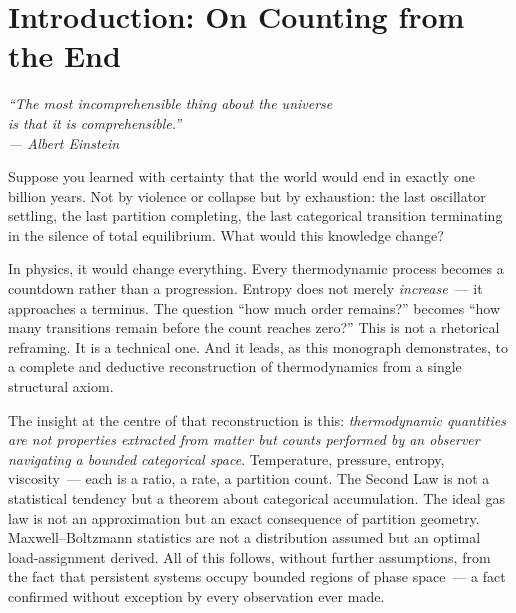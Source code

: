 
\chapter*{Introduction: On Counting from the End}

\begin{flushright}
\textit{``The most incomprehensible thing about the universe\\
is that it is comprehensible.''\\[0.3em]
--- Albert Einstein}
\end{flushright}

\bigskip

\noindent
Suppose you learned with certainty that the world would end in exactly one billion years.
Not by violence or collapse but by exhaustion: the last oscillator settling, the last
partition completing, the last categorical transition terminating in the silence of
total equilibrium. What would this knowledge change?

In physics, it would change everything. Every thermodynamic process
becomes a countdown rather than a progression. Entropy does not merely
\emph{increase}~--- it approaches a terminus. The question ``how much
order remains?'' becomes ``how many transitions remain before the count reaches zero?''
This is not a rhetorical reframing. It is a technical one. And it leads,
as this monograph demonstrates, to a complete and deductive reconstruction of
thermodynamics from a single structural axiom.

The insight at the centre of that reconstruction is this: \emph{thermodynamic quantities
are not properties extracted from matter but counts performed by an observer
navigating a bounded categorical space}. Temperature, pressure, entropy, viscosity~---
each is a ratio, a rate, a partition count. The Second Law is not a statistical
tendency but a theorem about categorical accumulation. The ideal gas law is not an
approximation but an exact consequence of partition geometry. Maxwell--Boltzmann
statistics are not a distribution assumed but an optimal load-assignment derived.
All of this follows, without further assumptions, from the fact that persistent
systems occupy bounded regions of phase space~--- a fact confirmed without exception
by every observation ever made.

